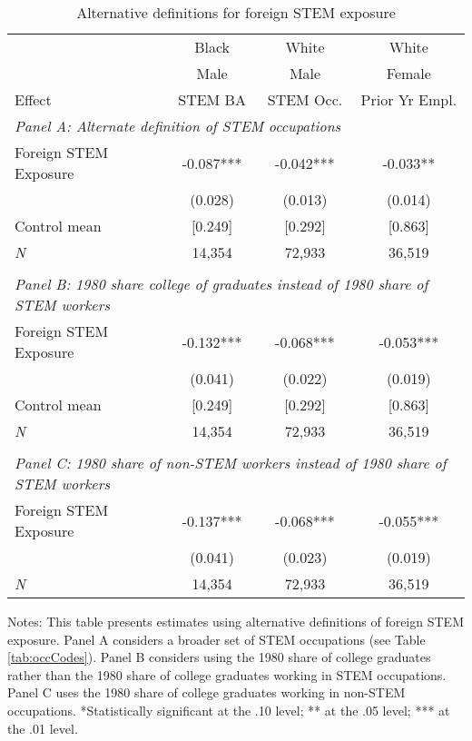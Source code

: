 \begin{table}[ht]
\caption{Alternative definitions for foreign STEM exposure}
\label{tab:ta4}
\centering
\begin{threeparttable}
\begin{tabular}{lccc}
\toprule 
       & Black           & White        & White       \\
       & Male            & Male         & Female      \\
Effect & STEM BA         & STEM Occ.    & Prior Yr Empl.\\
\midrule 
\multicolumn{4}{l}{\emph{Panel A: Alternate definition of STEM occupations}}\\ 
Foreign STEM Exposure & -0.087*** & -0.042*** & -0.033** \\ 
 &  (0.028)        & (0.013)        & (0.014) \\ 
Control mean &  [0.249]        & [0.292]       & [0.863] \\ 
\emph{N} &     14,354          &    72,933          &    36,519 \\ 
                         &                              &                              &\\
\multicolumn{4}{l}{\emph{Panel B: 1980 share college of graduates instead of 1980 share of STEM workers}}\\ 
Foreign STEM Exposure & -0.132*** & -0.068*** & -0.053*** \\ 
 &  (0.041)        & (0.022)        & (0.019) \\ 
Control mean &  [0.249]        & [0.292]       & [0.863] \\ 
\emph{N} &     14,354          &    72,933          &    36,519 \\ 
                         &                              &                              &\\
\multicolumn{4}{l}{\emph{Panel C: 1980 share of non-STEM workers instead of 1980 share of STEM workers}}\\ 
Foreign STEM Exposure & -0.137*** & -0.068*** & -0.055*** \\ 
 &  (0.041)        & (0.023)        & (0.019) \\ 
\emph{N} &     14,354          &    72,933          &    36,519 \\ 
\bottomrule 
\end{tabular} 
\footnotesize Notes: This table presents estimates using alternative definitions of foreign STEM exposure. Panel A considers a broader set of STEM occupations (see Table \ref{tab:occCodes}). Panel B considers using the 1980 share of college graduates rather than the 1980 share of college graduates working in STEM occupations. Panel C uses the 1980 share of college graduates working in non-STEM occupations. *Statistically significant at the .10 level; ** at the .05 level; *** at the .01 level.
\end{threeparttable} 
\end{table} 
